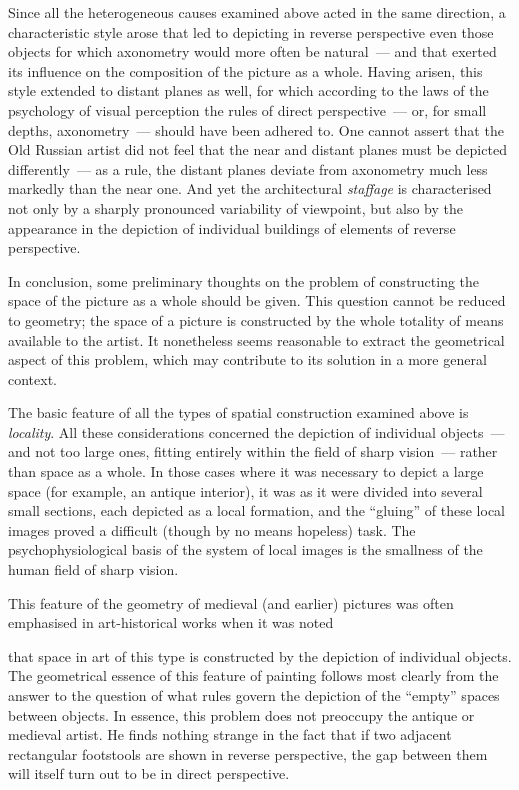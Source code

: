 Since all the heterogeneous causes examined above acted in the same direction, a
characteristic style arose that led to depicting in reverse perspective even those
objects for which axonometry would more often be natural~--- and that exerted its
influence on the composition of the picture as a whole.  Having arisen, this style
extended to distant planes as well, for which according to the laws of the psychology
of visual perception the rules of direct perspective~--- or, for small depths,
axonometry~--- should have been adhered to.  One cannot assert that the Old Russian
artist did not feel that the near and distant planes must be depicted differently~---
as a rule, the distant planes deviate from axonometry much less markedly than the near
one.  And yet the architectural \emph{staffage} is characterised not only by a
sharply pronounced variability of viewpoint, but also by the appearance in the
depiction of individual buildings of elements of reverse perspective.


In conclusion, some preliminary thoughts on the problem of constructing the space of
the picture as a whole should be given.  This question cannot be reduced to geometry;
the space of a picture is constructed by the whole totality of means available to the
artist.  It nonetheless seems reasonable to extract the geometrical aspect of this
problem, which may contribute to its solution in a more general context.

The basic feature of all the types of spatial construction examined above is
\emph{locality}.  All these considerations concerned the depiction of individual
objects~--- and not too large ones, fitting entirely within the field of sharp
vision~--- rather than space as a whole.  In those cases where it was necessary to
depict a large space (for example, an antique interior), it was as it were divided
into several small sections, each depicted as a local formation, and the ``gluing'' of
these local images proved a difficult (though by no means hopeless) task.  The
psychophysiological basis of the system of local images is the smallness of the human
field of sharp vision.

This feature of the geometry of medieval (and earlier) pictures was often emphasised
in art-historical works when it was noted


that space in art of this type is constructed by the depiction of individual objects.
The geometrical essence of this feature of painting follows most clearly from the
answer to the question of what rules govern the depiction of the ``empty'' spaces
between objects.  In essence, this problem does not preoccupy the antique or medieval
artist.  He finds nothing strange in the fact that if two adjacent rectangular
footstools are shown in reverse perspective, the gap between them will itself turn out
to be in direct perspective.

